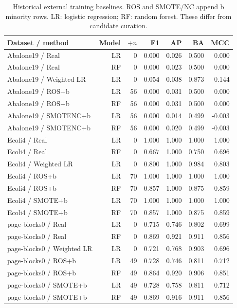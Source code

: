 \begin{table}[!t]
\centering
\caption{Historical external training baselines. ROS and SMOTE/NC append b minority rows. LR: logistic regression; RF: random forest. These differ from candidate curation.}\label{tab:external}
\footnotesize\setlength{\tabcolsep}{6pt}
\begin{tabular}{lrrrrrr}
\toprule
Dataset / method & Model & $+n$ & F1 & AP & BA & MCC \\
\midrule
Abalone19 / Real & LR & 0 & 0.000 & 0.026 & 0.500 & 0.000 \\
Abalone19 / Real & RF & 0 & 0.000 & 0.023 & 0.500 & 0.000 \\
Abalone19 / Weighted LR & LR & 0 & 0.054 & 0.038 & 0.873 & 0.144 \\
Abalone19 / ROS+b & LR & 56 & 0.000 & 0.031 & 0.500 & 0.000 \\
Abalone19 / ROS+b & RF & 56 & 0.000 & 0.031 & 0.500 & 0.000 \\
Abalone19 / SMOTENC+b & LR & 56 & 0.000 & 0.014 & 0.499 & -0.003 \\
Abalone19 / SMOTENC+b & RF & 56 & 0.000 & 0.020 & 0.499 & -0.003 \\
Ecoli4 / Real & LR & 0 & 1.000 & 1.000 & 1.000 & 1.000 \\
Ecoli4 / Real & RF & 0 & 0.667 & 1.000 & 0.750 & 0.696 \\
Ecoli4 / Weighted LR & LR & 0 & 0.800 & 1.000 & 0.984 & 0.803 \\
Ecoli4 / ROS+b & LR & 70 & 1.000 & 1.000 & 1.000 & 1.000 \\
Ecoli4 / ROS+b & RF & 70 & 0.857 & 1.000 & 0.875 & 0.859 \\
Ecoli4 / SMOTE+b & LR & 70 & 1.000 & 1.000 & 1.000 & 1.000 \\
Ecoli4 / SMOTE+b & RF & 70 & 0.857 & 1.000 & 0.875 & 0.859 \\
page-blocks0 / Real & LR & 0 & 0.715 & 0.746 & 0.802 & 0.699 \\
page-blocks0 / Real & RF & 0 & 0.869 & 0.921 & 0.911 & 0.856 \\
page-blocks0 / Weighted LR & LR & 0 & 0.721 & 0.768 & 0.903 & 0.696 \\
page-blocks0 / ROS+b & LR & 49 & 0.728 & 0.746 & 0.811 & 0.712 \\
page-blocks0 / ROS+b & RF & 49 & 0.864 & 0.920 & 0.906 & 0.851 \\
page-blocks0 / SMOTE+b & LR & 49 & 0.728 & 0.758 & 0.811 & 0.712 \\
page-blocks0 / SMOTE+b & RF & 49 & 0.869 & 0.916 & 0.911 & 0.856 \\
\bottomrule
\end{tabular}
\end{table}
